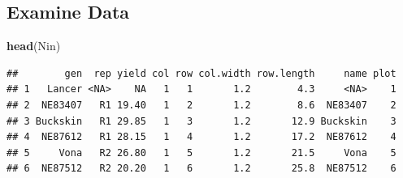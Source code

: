 \documentclass[]{book}
\newenvironment{Shaded}{\begin{snugshade}}{\end{snugshade}}
\newcommand{\DataTypeTok}[1]{\textcolor[rgb]{0.13,0.29,0.53}{#1}}
\newcommand{\DecValTok}[1]{\textcolor[rgb]{0.00,0.00,0.81}{#1}}
\newcommand{\FloatTok}[1]{\textcolor[rgb]{0.00,0.00,0.81}{#1}}
\newcommand{\KeywordTok}[1]{\textcolor[rgb]{0.13,0.29,0.53}{\textbf{#1}}}
\newcommand{\NormalTok}[1]{#1}
\newcommand{\OperatorTok}[1]{\textcolor[rgb]{0.81,0.36,0.00}{\textbf{#1}}}
\newcommand{\OtherTok}[1]{\textcolor[rgb]{0.56,0.35,0.01}{#1}}
\newcommand{\StringTok}[1]{\textcolor[rgb]{0.31,0.60,0.02}{#1}}
\begin{document}
\begin{Shaded}
\end{Shaded}

\hypertarget{examine-data}{%
\subsection{Examine Data}\label{examine-data}}

\begin{Shaded}
\begin{Highlighting}[]
\KeywordTok{head}\NormalTok{(Nin)}
\end{Highlighting}
\end{Shaded}

\begin{verbatim}
##        gen  rep yield col row col.width row.length     name plot
## 1   Lancer <NA>    NA   1   1       1.2        4.3     <NA>    1
## 2  NE83407   R1 19.40   1   2       1.2        8.6  NE83407    2
## 3 Buckskin   R1 29.85   1   3       1.2       12.9 Buckskin    3
## 4  NE87612   R1 28.15   1   4       1.2       17.2  NE87612    4
## 5     Vona   R2 26.80   1   5       1.2       21.5     Vona    5
## 6  NE87512   R2 20.20   1   6       1.2       25.8  NE87512    6
\end{verbatim}
\end{document}
